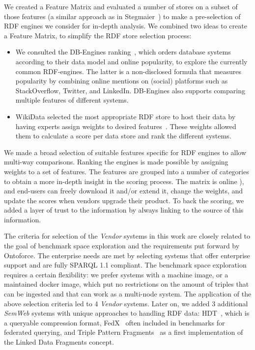 
We created a Feature Matrix and evaluated a number of stores on a subset of those features (a similar approach as in Stegmaier~\cite{Stegmaier_evaluationof}) to make a pre-selection of RDF engines we consider for in-depth analysis.
We combined two ideas to create a Feature Matrix, to simplify the RDF store selection process:
\begin{itemize}
\item We consulted the DB-Engines ranking~\cite{dbengines}, which orders database systems according to their data model and online popularity, to explore the currently common 
RDF-engines.
The latter is a non-disclosed formula that measures popularity by combining online mentions on (social) platforms such as StackOverflow, Twitter, and LinkedIn. 
DB-Engines also supports comparing multiple features of different systems.
\item WikiData selected the most appropriate RDF store to host their data by having experts assign weights to desired features~\cite{wikidataranking}.
These weights allowed them to calculate a score per data store and rank the different systems. 
\end{itemize}
We made a broad selection of suitable features specific for RDF engines to allow multi-way comparisons. Ranking the engines is made possible by assigning weights to a set of features. 
The features are grouped into a number of categories to obtain a more in-depth insight in the scoring process. 
The matrix is online ), and end-users can freely download it and/or extend it, change the weights, and update the scores when vendors upgrade their product. 
To back the scoring, we added a layer of trust to the information by always linking to the source of this information.

The criteria for selection of the \emph{Vendor} systems in this work are closely related to the goal of benchmark space exploration and the requirements put forward by Ontoforce. 
The enterprise needs are met by selecting systems that offer enterprise support and are fully SPARQL 1.1 compliant. The benchmark space exploration requires a certain flexibility: we prefer systems with a machine image, or a maintained docker image, which put no restrictions on the amount of triples that can be ingested and that can work as a multi-node system.
The application of the above selection criteria led to 4 \emph{Vendor} systems. 
Later on, we added 3 additional \emph{SemWeb} systems with unique approaches to handling RDF data: HDT~\cite{DBLP:journals/ws/FernandezMGPA13}, which is a queryable compression format, FedX~\cite{DBLP:conf/semweb/SchwarteHHSS11} often included in benchmarks for federated querying, and Triple Pattern Fragments~\cite{DBLP:conf/semweb/VerborghHMHVSCCMW14} as a first implementation of the Linked Data Fragments concept.


